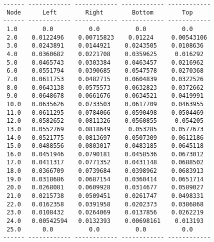 \begin{lstlisting}
 ------ ------------ ------------ ------------ ------------
  Node      Left        Right        Bottom        Top     
 ------ ------------ ------------ ------------ ------------
  1.0       0.0          0.0          0.0          0.0
  2.0    0.0122496    0.00715823    0.01224     0.00543106
  3.0    0.0243891    0.0144921    0.0243505    0.0108636
  4.0    0.0360682    0.0221708    0.0359625     0.016292
  5.0    0.0465743    0.0303384    0.0463457    0.0216962
  6.0    0.0551794    0.0390685    0.0547578    0.0270368
  7.0    0.0611753    0.0482715    0.0604839    0.0322526
  8.0    0.0643138    0.0575573    0.0632823    0.0372662
  9.0    0.0648678    0.0661676    0.0634521    0.0419991
  10.0   0.0635626    0.0733503    0.0617709    0.0463955
  11.0   0.0611295    0.0784066    0.0590498    0.0504469
  12.0   0.0582652    0.0811326    0.0560855     0.054205
  13.0   0.0552769    0.0818649     0.053285    0.0577673
  14.0   0.0521775    0.0813697    0.0507309    0.0612186
  15.0   0.0488556    0.0803017    0.0483185    0.0645118
  16.0   0.0451946    0.0790181    0.0458536    0.0673012
  17.0   0.0411317    0.0771352    0.0431148    0.0688502
  18.0   0.0366709    0.0739684    0.0398962    0.0683913
  19.0   0.0318686    0.0687154    0.0360414    0.0651714
  20.0   0.0268081    0.0609928    0.0314677    0.0589027
  21.0   0.0215738    0.0509451    0.0261747    0.0498331
  22.0   0.0162358    0.0391958    0.0202373    0.0386868
  23.0   0.0108432    0.0264069    0.0137856    0.0262219
  24.0   0.00542594   0.0132393    0.00698161    0.013193
  25.0      0.0          0.0          0.0          0.0
 ------ ------------ ------------ ------------ ------------
\end{lstlisting}